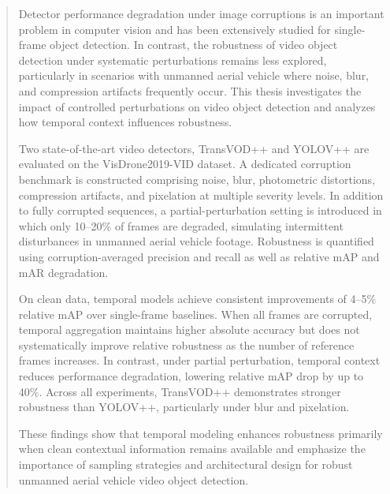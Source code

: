 \documentclass[final,twoside]{vutinfth}
\begin{document}
\begin{abstract}
Detector performance degradation under image corruptions is an important problem in computer vision and has been extensively studied for single-frame object detection.
In contrast, the robustness of video object detection under systematic perturbations remains less explored, particularly in scenarios with unmanned aerial vehicle where noise, blur, and compression artifacts frequently occur.
This thesis investigates the impact of controlled perturbations on video object detection and analyzes how temporal context influences robustness.

Two state-of-the-art video detectors, TransVOD++ and YOLOV++ are evaluated on the VisDrone2019-VID dataset.
A dedicated corruption benchmark is constructed comprising noise, blur, photometric distortions, compression artifacts, and pixelation at multiple severity levels.
In addition to fully corrupted sequences, a partial-perturbation setting is introduced in which only 10--20\% of frames are degraded, simulating intermittent disturbances in unmanned aerial vehicle footage.
Robustness is quantified using corruption-averaged precision and recall as well as relative mAP and mAR degradation.

On clean data, temporal models achieve consistent improvements of 4--5\% relative mAP over single-frame baselines.
When all frames are corrupted, temporal aggregation maintains higher absolute accuracy but does not systematically improve relative robustness as the number of reference frames increases.
In contrast, under partial perturbation, temporal context reduces performance degradation, lowering relative mAP drop by up to 40\%.
Across all experiments, TransVOD++ demonstrates stronger robustness than YOLOV++, particularly under blur and pixelation.

These findings show that temporal modeling enhances robustness primarily when clean contextual information remains available and emphasize the importance of sampling strategies and architectural design for robust unmanned aerial vehicle video object detection.
\end{abstract}



\tableofcontents %

\mainmatter%
\end{document}
